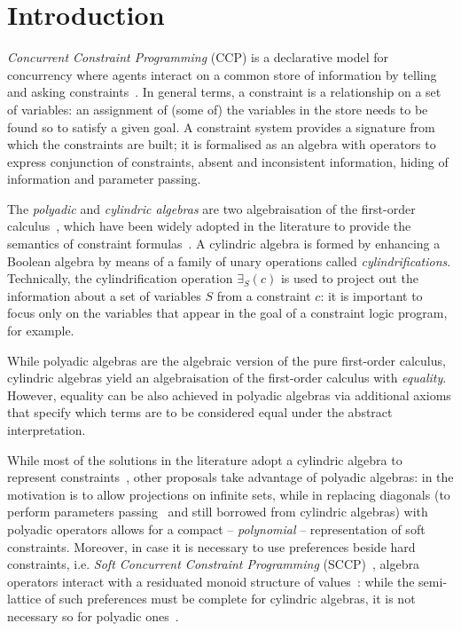 \documentclass{llncs}
\begin{document}

\section{Introduction}\label{sec:intro}
\emph{Concurrent Constraint Programming} (CCP) is a declarative model for concurrency where agents interact on a common store of information by telling and asking constraints~\cite{emerging}.  In general terms, a constraint is a relationship on a set of variables: an assignment of (some of) the variables in the store needs to be found so to satisfy a given goal.  A constraint system provides a signature from which the constraints are built;  it is formalised as an algebra with operators to express conjunction of constraints, absent and inconsistent information, hiding of information and parameter passing.


The \emph{polyadic}  and  \emph{cylindric algebras} are two algebraisation of  the first-order calculus~\cite{cylalgebraic}, which have been widely  adopted in the literature to provide the semantics of constraint formulas~\cite{fgcs92,popl91}. A cylindric algebra is formed by enhancing a Boolean algebra by means of a family of unary operations called \emph{cylindrifications}. Technically, the cylindrification operation $\exists_S(c)$ is used to project out the information about a set of variables $S$ from a constraint $c$: it is important to focus only on  the variables that appear in the goal of a constraint logic program, for example.

While polyadic algebras are the algebraic version of the pure first-order calculus, cylindric algebras yield an algebraisation of the first-order calculus with \emph{equality}. However, equality can be also achieved in polyadic algebras via additional axioms that specify which terms are to be considered equal under the abstract interpretation.

 While most of the solutions in the literature adopt a cylindric algebra to represent constraints~\cite{popl91}, other proposals take advantage of polyadic algebras: in \cite{fgcs92} the motivation is to allow projections on infinite sets, while in  \cite{festcatuscia} replacing diagonals (to perform parameters passing~\cite{popl91} and still borrowed from cylindric algebras) with polyadic operators allows for a compact – \emph{polynomial} – representation of soft constraints.  Moreover, in case it is necessary to use preferences beside hard constraints, i.e. \emph{Soft Concurrent Constraint Programming} (SCCP)~\cite{jacm97,jlamp17}, algebra operators interact with a residuated monoid structure of values~\cite{ipl17}: while the semi-lattice of such preferences must be complete for cylindric algebras,  it is not necessary so for polyadic ones~\cite{festcatuscia}.
\end{document}
